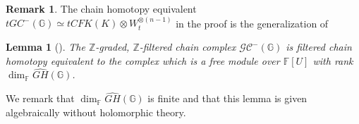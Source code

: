 \documentclass[12pt]{amsart}
\theoremstyle{plain}
\theoremstyle{definition}
\newtheorem{rem}[thm]{Remark}
\theoremstyle{plain}
\newtheorem{lem}[thm]{Lemma}
\theoremstyle{definition}
\newcommand{\Z}{\mathbb{Z}}
\newcommand{\G}{\mathbb{G}}
\numberwithin{equation}{section}
\begin{document}
\begin{rem}
The chain homotopy equivalent $tGC^-(\G) \simeq tCFK(K)\otimes W_t^{\otimes (n-1)}$ in the proof is the generalization of \cite[Corollary 2.8]{Unoriented-knot-Floer-homology-and-the-unoriented-four-ball-genus}
\end{rem}

\begin{lem}[{\cite[Lemma 14.2.1]{Grid-homology-for-knots-and-links}}]
\label{lem:finite-complex}
The $\Z$-graded, $\Z$-filtered chain complex $\mathcal{GC}^-(\G)$ is filtered chain homotopy equivalent to the complex which is a free module over $\mathbb{F}[U]$ with rank $\dim_\mathbb{F}\widehat{GH}(\G)$. 
\end{lem}
We remark that $\dim_\mathbb{F}\widehat{GH}(\G)$ is finite and that this lemma is given algebraically without holomorphic theory.
\end{document}
